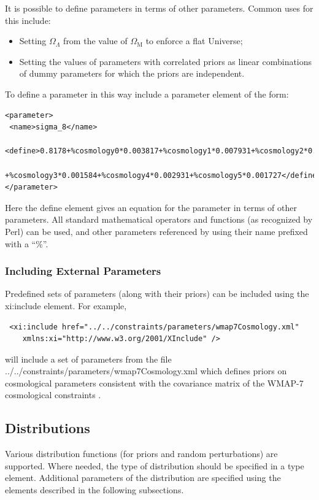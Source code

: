 It is possible to define parameters in terms of other parameters. Common uses for this include:
\begin{itemize}
 \item Setting $\Omega_\Lambda$ from the value of $\Omega_{\mathrm M}$ to enforce a flat Universe;
 \item Setting the values of parameters with correlated priors as linear combinations of dummy parameters for which the priors are independent.
\end{itemize}
To define a parameter in this way include a {\normalfont \ttfamily parameter} element of the form:
\begin{verbatim}
<parameter>
 <name>sigma_8</name>
 <define>0.8178+%cosmology0*0.003817+%cosmology1*0.007931+%cosmology2*0.01002
    +%cosmology3*0.001584+%cosmology4*0.002931+%cosmology5*0.001727</define>
</parameter>
\end{verbatim}
Here the {\normalfont \ttfamily define} element gives an equation for the parameter in terms of other parameters. All standard mathematical operators and functions (as recognized by Perl) can be used, and other parameters referenced by using their name prefixed with a ``\%''.

\subsubsection{Including External Parameters}

Predefined sets of parameters (along with their priors) can be included using the {\normalfont \ttfamily xi:include} element. For example,
\begin{verbatim}
 <xi:include href="../../constraints/parameters/wmap7Cosmology.xml"
    xmlns:xi="http://www.w3.org/2001/XInclude" />
\end{verbatim}
will include a set of parameters from the file {\normalfont \ttfamily ../../constraints/parameters/wmap7Cosmology.xml} which defines priors on cosmological parameters consistent with the covariance matrix of the WMAP-7 cosmological constraints \citep{komatsu_seven-year_2010}.

\subsection{Distributions}

Various distribution functions (for priors and random perturbations) are supported. Where needed, the type of distribution should be specified in a {\normalfont \ttfamily type} element. Additional parameters of the distribution are specified using the elements described in the following subsections.

